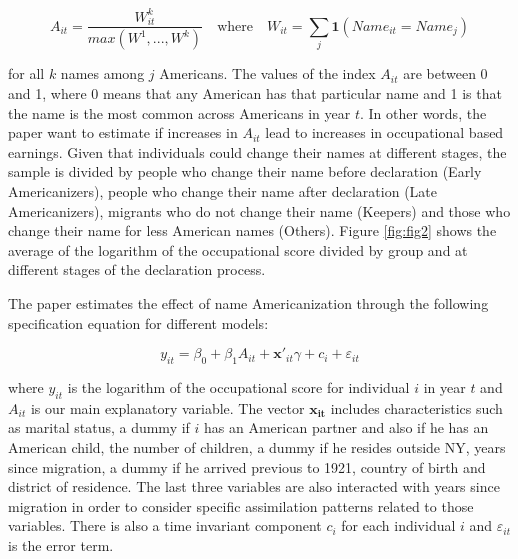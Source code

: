 \documentclass[12pt]{article}
\begin{document}
$$A_{it}=\frac{W^k_{it}}{max(W^1,...,W^k)} \quad \text{where} \quad  W_{it}=\sum_j\mathbf{1}(Name_{it}=Name_j)$$

for all $k$ names among $j$ Americans. The values of the index $A_{it}$ are between 0 and 1, where 0 means that any American has that particular name and 1 is that the name is the most common across Americans in year $t$. In other words, the paper want to estimate if increases in $A_{it}$ lead to increases in occupational based earnings. Given that individuals could change their names at different stages, the sample is divided by people who change their name before declaration (Early Americanizers),  people who change their name after declaration (Late Americanizers), migrants who do not change their name (Keepers) and those who change their name for less American names (Others). Figure \ref{fig:fig2} shows the average of the logarithm of the occupational score divided by group and at different stages of the declaration process. 

\medskip

The paper estimates the effect of name Americanization through the following specification equation for different models:

\begin{equation}
y_{it}=\beta_0+\beta_1A_{it}+\mathbf{x'}_{it}\gamma+c_i+\varepsilon_{it}
\end{equation}

where $y_{it}$ is the logarithm of the occupational score for individual $i$ in year $t$ and $A_{it}$ is our main explanatory variable. The vector $\mathbf{x_{it}}$ includes characteristics such as marital status, a dummy if $i$ has an American partner and also if he has an American child, the number of children, a dummy if he resides outside NY, years since migration, a dummy if he arrived previous to 1921, country of birth and district of residence. The last three variables are also interacted with years since migration in order to consider specific assimilation patterns related to those variables. There is also a time invariant component $c_i$ for each individual $i$ and $\varepsilon_{it}$ is the error term.

\medskip 
\end{document}
